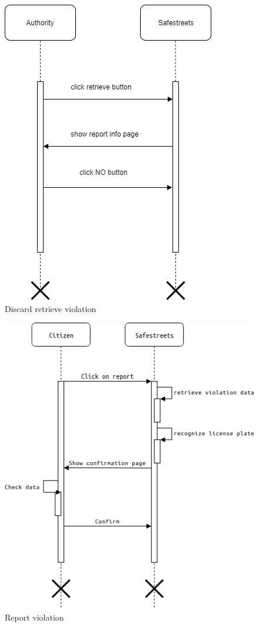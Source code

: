 \documentclass{article}
\begin{document}
\begin{figure}[H]
    \centering
    \includegraphics[scale=0.5]{img/sequence_diagrams/discard_retrieve_violation.png}
    \caption{Discard retrieve violation}
\end{figure}

\begin{figure}[H]
    \centering
    \includegraphics[scale=0.5]{img/sequence_diagrams/report_violation.png}
    \caption{Report violation}
\end{figure}
\end{document}
